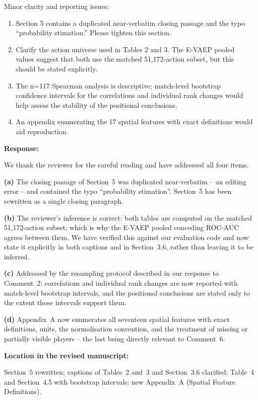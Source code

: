 \documentclass[11pt,a4paper]{article}
\newcommand{\pending}[1]{\textcolor{statuspending}{#1}}
\newcommand{\newwork}[1]{\textcolor{statusnew}{#1}}
\newcommand{\response}[2]{%
  \begin{responsebox}
  \textbf{Response:}

  #1
  \end{responsebox}
  \begin{locationbox}
  \textbf{Location in the revised manuscript:}

  #2
  \end{locationbox}
}
\begin{document}
\begin{reviewbox}[Comment 8]
Minor clarity and reporting issues:

\begin{enumerate}[label=\alph*)]
  \item Section 5 contains a duplicated near-verbatim closing passage and the typo “probability stimation.” Please tighten this section.
  \item Clarify the action universe used in Tables 2 and 3. The E-VAEP pooled values suggest that both use the matched 51,172-action subset, but this should be stated explicitly.
  \item The n=117 Spearman analysis is descriptive; match-level bootstrap confidence intervals for the correlations and individual rank changes would help assess the stability of the positional conclusions.
  \item An appendix enumerating the 17 spatial features with exact definitions would aid reproduction.
\end{enumerate}
\end{reviewbox}
\response{We thank the reviewer for the careful reading and have addressed all four items.

\textbf{(a)} The closing passage of Section~5 was duplicated near-verbatim -- an editing error -- and contained the typo ``probability stimation''. Section~5 has been rewritten as a single closing paragraph.

\textbf{(b)} The reviewer's inference is correct: both tables are computed on the matched 51{,}172-action subset, which is why the E-VAEP pooled conceding ROC-AUC agrees between them. We have verified this against our evaluation code and now state it explicitly in both captions and in Section~3.6, rather than leaving it to be inferred.

\pending{\textbf{(c)} Addressed by the resampling protocol described in our response to Comment~2: correlations and individual rank changes are now reported with match-level bootstrap intervals, and the positional conclusions are stated only to the extent those intervals support them.}

\newwork{\textbf{(d)} Appendix~A now enumerates all seventeen spatial features with exact definitions, units, the normalisation convention, and the treatment of missing or partially visible players -- the last being directly relevant to Comment~6.}}{Section~5 rewritten; captions of Tables~2 and~3 and Section~3.6 clarified; Table~4 and Section~4.5 with bootstrap intervals; new Appendix~A (Spatial Feature Definitions).}
\end{document}
